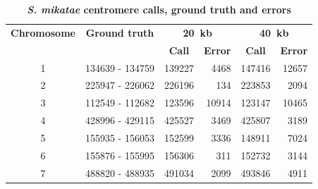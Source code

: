 \begin{table}[ht!]
\caption{\textbf{\textit{S. mikatae} centromere calls, ground truth and errors}}
\begin{center}
\begin{tabular}{c | c  r  r  r  r}
\textbf{Chromosome}  & \textbf{Ground truth} & \multicolumn{2}{c}{\textbf{20~kb}} & \multicolumn{2}{c}{\textbf{40~kb}} \\
  &   &  \multicolumn{1}{c}{\textbf{Call}} &  \multicolumn{1}{c}{\textbf{Error}} &  \multicolumn{1}{c}{\textbf{Call}} &  \multicolumn{1}{c}{\textbf{Error}} \\
\hline
1 & \num[group-separator={\,}]{134639} - \num[group-separator={\,}]{134759} & \num[group-separator={\,}]{139227} & \small{\num[group-separator={\,}]{4468}}  & \num[group-separator={\,}]{147416} & \small{\num[group-separator={\,}]{12657}}  \\
2 & \num[group-separator={\,}]{225947} - \num[group-separator={\,}]{226062} & \num[group-separator={\,}]{226196} & \small{\num[group-separator={\,}]{134}}  & \num[group-separator={\,}]{223853} & \small{\num[group-separator={\,}]{2094}}  \\
3 & \num[group-separator={\,}]{112549} - \num[group-separator={\,}]{112682} & \num[group-separator={\,}]{123596} & \small{\num[group-separator={\,}]{10914}}  & \num[group-separator={\,}]{123147} & \small{\num[group-separator={\,}]{10465}}  \\
4 & \num[group-separator={\,}]{428996} - \num[group-separator={\,}]{429115} & \num[group-separator={\,}]{425527} & \small{\num[group-separator={\,}]{3469}}  & \num[group-separator={\,}]{425807} & \small{\num[group-separator={\,}]{3189}}  \\
5 & \num[group-separator={\,}]{155935} - \num[group-separator={\,}]{156053} & \num[group-separator={\,}]{152599} & \small{\num[group-separator={\,}]{3336}}  & \num[group-separator={\,}]{148911} & \small{\num[group-separator={\,}]{7024}}  \\
6 & \num[group-separator={\,}]{155876} - \num[group-separator={\,}]{155995} & \num[group-separator={\,}]{156306} & \small{\num[group-separator={\,}]{311}}  & \num[group-separator={\,}]{152732} & \small{\num[group-separator={\,}]{3144}}  \\
7 & \num[group-separator={\,}]{488820} - \num[group-separator={\,}]{488935} & \num[group-separator={\,}]{491034} & \small{\num[group-separator={\,}]{2099}}  & \num[group-separator={\,}]{493846} & \small{\num[group-separator={\,}]{4911}}  \\

\end{tabular}
\end{center}
\end{table}
